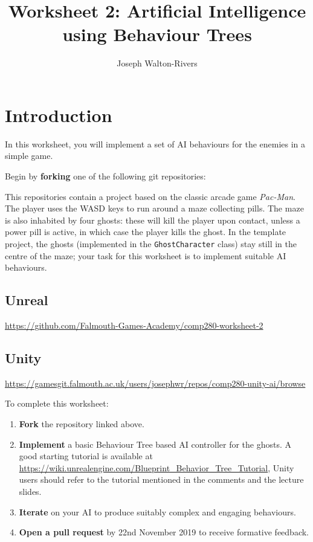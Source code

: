 \documentclass{../../../fal_assignment}
\title{Worksheet 2: Artificial Intelligence using Behaviour Trees}
\author{Joseph Walton-Rivers}
\begin{document}
\maketitle


\section*{Introduction}

In this worksheet, you will implement a set of AI behaviours for the enemies in a simple game.

Begin by \textbf{forking} one of the following git repositories:

This repositories contain a  project based on the classic arcade game \emph{Pac-Man}.
The player uses the WASD keys to run around a maze collecting pills.
The maze is also inhabited by four ghosts:
these will kill the player upon contact, unless a power pill is active, in which case the player kills the ghost.
In the template project, the ghosts (implemented in the \texttt{GhostCharacter} class) stay still in the centre of the maze;
your task for this worksheet is to implement suitable AI behaviours.

\subsection*{Unreal}
\begin{center}
	\url{https://github.com/Falmouth-Games-Academy/comp280-worksheet-2}
\end{center}

\subsection*{Unity}

\begin{center}
	\url{https://gamesgit.falmouth.ac.uk/users/josephwr/repos/comp280-unity-ai/browse}
\end{center}

To complete this worksheet:

\begin{enumerate}
	\item \textbf{Fork} the repository linked above.
	\item \textbf{Implement} a basic Behaviour Tree based AI controller for the ghosts.
		A good starting tutorial is available at \url{https://wiki.unrealengine.com/Blueprint\_Behavior\_Tree\_Tutorial}, Unity users should refer to the tutorial mentioned in the comments and the lecture slides.
	\item \textbf{Iterate} on your AI to produce suitably complex and engaging behaviours.
	\item \textbf{Open a pull request} by 22nd November 2019 to receive formative feedback.
\end{enumerate}
\end{document}
